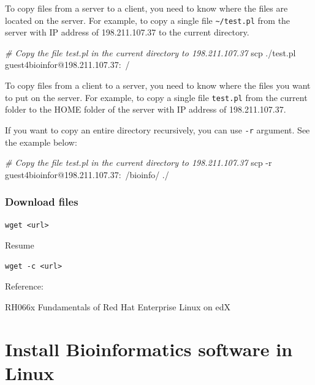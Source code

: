 \documentclass[]{book}
\makeatletter
\newenvironment{Shaded}{\begin{snugshade}}{\end{snugshade}}
\newcommand{\CommentTok}[1]{\textcolor[rgb]{0.56,0.35,0.01}{\textit{#1}}}
\newcommand{\FunctionTok}[1]{\textcolor[rgb]{0.00,0.00,0.00}{#1}}
\newcommand{\NormalTok}[1]{#1}
\newenvironment{kframe}{%
\medskip{}
\setlength{\fboxsep}{.8em}
 \def\at@end@of@kframe{}%
 \ifinner\ifhmode%
  \def\at@end@of@kframe{\end{minipage}}%
  \begin{minipage}{\columnwidth}%
 \fi\fi%
 \def\FrameCommand##1{\hskip\@totalleftmargin \hskip-\fboxsep
 \colorbox{shadecolor}{##1}\hskip-\fboxsep
     \hskip-\linewidth \hskip-\@totalleftmargin \hskip\columnwidth}%
 \MakeFramed {\advance\hsize-\width
   \@totalleftmargin\z@ \linewidth\hsize
   \@setminipage}}%
 {\par\unskip\endMakeFramed%
 \at@end@of@kframe}
\renewenvironment{Shaded}{\begin{kframe}}{\end{kframe}}
\makeatother
\begin{document}
To copy files from a server to a client, you need to know where the files are located on the server. For example, to copy a single file \texttt{\textasciitilde{}/test.pl} from the server with IP address of 198.211.107.37 to the current directory.

\begin{Shaded}
\begin{Highlighting}[]
\CommentTok{# Copy the file test.pl in the current directory to  198.211.107.37}
\FunctionTok{scp}\NormalTok{ ./test.pl guest4bioinfor@198.211.107.37:~/}
\end{Highlighting}
\end{Shaded}

To copy files from a client to a server, you need to know where the files you want to put on the server. For example, to copy a single file \texttt{test.pl} from the current folder to the HOME folder of the server with IP address of 198.211.107.37.

If you want to copy an entire directory recursively, you can use \texttt{-r} argument. See the example below:

\begin{Shaded}
\begin{Highlighting}[]
\CommentTok{# Copy the file test.pl in the current directory to  198.211.107.37}
\FunctionTok{scp}\NormalTok{ -r guest4bioinfor@198.211.107.37:~/bioinfo/ ./}
\end{Highlighting}
\end{Shaded}

\hypertarget{download-files}{%
\subsection{Download files}\label{download-files}}

\begin{verbatim}
wget <url>
\end{verbatim}

Resume

\begin{verbatim}
wget -c <url>  
\end{verbatim}

Reference:

RH066x Fundamentals of Red Hat Enterprise Linux on edX

\hypertarget{install-bioinformatics-software-in-linux}{%
\chapter{Install Bioinformatics software in Linux}\label{install-bioinformatics-software-in-linux}}
\end{document}
